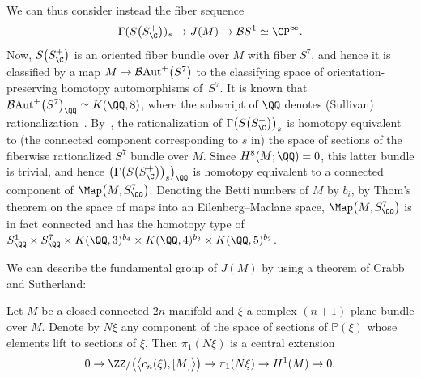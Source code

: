 We can thus consider instead the fiber sequence \begin{equation}\label{fibration2} \Gamma(S\big(S_{\C}^+\big))_s \to J(M) \to {\mathcal B}S ^1 \simeq \CP^\infty. \end{equation} Now, $S\big(S_{\C}^+\big)$ is an oriented fiber bundle over $M$ with fiber $S^7$, and hence it is classified by a map $M \to {\mathcal B}{\rm Aut}^+\big(S^7\big)$ to the classifying space of orientation-preserving homotopy automorphisms of~$S^7$. It is known that ${\mathcal B}{\rm Aut}^+\big(S^7\big)_{\QQ} \simeq K(\QQ, 8)$, where the subscript of $\QQ$ denotes (Sullivan) rationalization~\cite[Section~11]{S77}. By~\cite[Theorem~5.3]{M87}, the rationalization of $\Gamma\big(S\big(S_{\C}^+\big)\big)_s$ is homotopy equivalent to (the connected component corresponding to $s$ in) the space of sections of the fiberwise rationalized $S^7$ bundle over $M$. Since $H^8(M;\QQ) = 0$, this latter bundle is trivial, and hence $\big(\Gamma\big(S\big(S_{\C}^+\big)\big)_s\big)_{\QQ}$ is homotopy equivalent to a connected component of $\Map\big(M, S^7_{\QQ}\big)$. Denoting the Betti numbers of $M$ by $b_i$, by Thom's theorem on the space of maps into an Eilenberg--Maclane space, $\Map\big(M, S^7_{\QQ}\big)$ is in fact connected and has the homotopy type of $S^1_{\QQ} \times S^7_{\QQ} \times K(\QQ, 3)^{b_4} \times K(\QQ, 4)^{b_3} \times K(\QQ,5)^{b_2}$.

We can describe the fundamental group of $J(M)$ by using a theorem of Crabb and Sutherland:

\begin{Theorem}[{\cite[Theorem~2.12(i)]{CS84}}] Let $M$ be a closed connected $2n$-manifold and $\xi$ a complex $(n+1)$-plane bundle over $M$. Denote by $N\xi$ any component of the space of sections of $\mathbb{P}(\xi)$ whose elements lift to sections of $\xi$. Then $\pi_1(N\xi)$ is a central extension \[0 \to \ZZ/\big(\big\langle c_n(\xi), [M] \big\rangle \big) \to \pi_1(N\xi) \to H^1(M) \to 0.\]
\end{Theorem}

